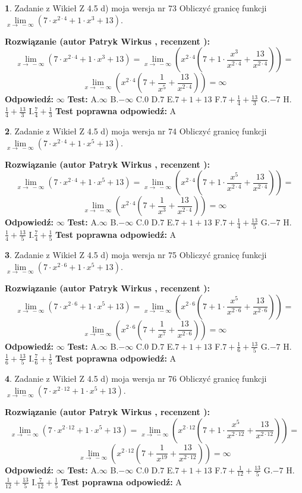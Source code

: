 \documentclass[12pt, a4paper]{article}
\theoremstyle{definition} %
\newtheorem{zad}{}
\newcommand{\zadStart}[1]{\begin{zad}#1\newline}
\newcommand{\zadStop}{\end{zad}}
\newcommand{\rozwStart}[2]{\noindent \textbf{Rozwiązanie (autor #1 , recenzent #2): }\newline}
\newcommand{\rozwStop}{\newline}
\newcommand{\odpStart}{\noindent \textbf{Odpowiedź:}\newline}
\newcommand{\odpStop}{\newline}
\newcommand{\testStart}{\noindent \textbf{Test:}\newline}
\newcommand{\testStop}{\newline}
\newcommand{\kluczStart}{\noindent \textbf{Test poprawna odpowiedź:}\newline}
\newcommand{\kluczStop}{\newline}
\begin{document}
\zadStart{Zadanie z Wikieł Z 4.5 d) moja wersja nr 73}
Obliczyć granicę funkcji  $\lim\limits_{x\to\ -\infty}(7 \cdot x^{2\cdot4}+1 \cdot x^{3}+13)$.
\zadStop
\rozwStart{Patryk Wirkus}{}
$$\lim\limits_{x\to\ -\infty}(7 \cdot x^{2\cdot4}+1 \cdot x^{3}+13) = \lim\limits_{x\to\ -\infty}(x^{2\cdot4}(7 +1 \cdot \frac{x^{3}}{x^{2\cdot4}}+\frac{13}{x^{2\cdot4}})) =$$ $$\lim\limits_{x\to\ -\infty}(x^{2\cdot4}(7 +\frac{1}{x^{5}}+\frac{13}{x^{2\cdot4}})) =\infty$$
\rozwStop
\odpStart
$\infty$
\odpStop
\testStart
A.$\infty$ B.$-\infty$ C.$0$ D.$7$ E.$7 + 1 + 13$
F.$7+\frac{1}{4}+\frac{13}{3}$ G.$-7$
H.$\frac{1}{4}+\frac{13}{3}$
I.$\frac{7}{4}+\frac{1}{3}$
\testStop
\kluczStart
A
\kluczStop



\zadStart{Zadanie z Wikieł Z 4.5 d) moja wersja nr 74}
Obliczyć granicę funkcji  $\lim\limits_{x\to\ -\infty}(7 \cdot x^{2\cdot4}+1 \cdot x^{5}+13)$.
\zadStop
\rozwStart{Patryk Wirkus}{}
$$\lim\limits_{x\to\ -\infty}(7 \cdot x^{2\cdot4}+1 \cdot x^{5}+13) = \lim\limits_{x\to\ -\infty}(x^{2\cdot4}(7 +1 \cdot \frac{x^{5}}{x^{2\cdot4}}+\frac{13}{x^{2\cdot4}})) =$$ $$\lim\limits_{x\to\ -\infty}(x^{2\cdot4}(7 +\frac{1}{x^{3}}+\frac{13}{x^{2\cdot4}})) =\infty$$
\rozwStop
\odpStart
$\infty$
\odpStop
\testStart
A.$\infty$ B.$-\infty$ C.$0$ D.$7$ E.$7 + 1 + 13$
F.$7+\frac{1}{4}+\frac{13}{5}$ G.$-7$
H.$\frac{1}{4}+\frac{13}{5}$
I.$\frac{7}{4}+\frac{1}{5}$
\testStop
\kluczStart
A
\kluczStop



\zadStart{Zadanie z Wikieł Z 4.5 d) moja wersja nr 75}
Obliczyć granicę funkcji  $\lim\limits_{x\to\ -\infty}(7 \cdot x^{2\cdot6}+1 \cdot x^{5}+13)$.
\zadStop
\rozwStart{Patryk Wirkus}{}
$$\lim\limits_{x\to\ -\infty}(7 \cdot x^{2\cdot6}+1 \cdot x^{5}+13) = \lim\limits_{x\to\ -\infty}(x^{2\cdot6}(7 +1 \cdot \frac{x^{5}}{x^{2\cdot6}}+\frac{13}{x^{2\cdot6}})) =$$ $$\lim\limits_{x\to\ -\infty}(x^{2\cdot6}(7 +\frac{1}{x^{7}}+\frac{13}{x^{2\cdot6}})) =\infty$$
\rozwStop
\odpStart
$\infty$
\odpStop
\testStart
A.$\infty$ B.$-\infty$ C.$0$ D.$7$ E.$7 + 1 + 13$
F.$7+\frac{1}{6}+\frac{13}{5}$ G.$-7$
H.$\frac{1}{6}+\frac{13}{5}$
I.$\frac{7}{6}+\frac{1}{5}$
\testStop
\kluczStart
A
\kluczStop



\zadStart{Zadanie z Wikieł Z 4.5 d) moja wersja nr 76}
Obliczyć granicę funkcji  $\lim\limits_{x\to\ -\infty}(7 \cdot x^{2\cdot12}+1 \cdot x^{5}+13)$.
\zadStop
\rozwStart{Patryk Wirkus}{}
$$\lim\limits_{x\to\ -\infty}(7 \cdot x^{2\cdot12}+1 \cdot x^{5}+13) = \lim\limits_{x\to\ -\infty}(x^{2\cdot12}(7 +1 \cdot \frac{x^{5}}{x^{2\cdot12}}+\frac{13}{x^{2\cdot12}})) =$$ $$\lim\limits_{x\to\ -\infty}(x^{2\cdot12}(7 +\frac{1}{x^{19}}+\frac{13}{x^{2\cdot12}})) =\infty$$
\rozwStop
\odpStart
$\infty$
\odpStop
\testStart
A.$\infty$ B.$-\infty$ C.$0$ D.$7$ E.$7 + 1 + 13$
F.$7+\frac{1}{12}+\frac{13}{5}$ G.$-7$
H.$\frac{1}{12}+\frac{13}{5}$
I.$\frac{7}{12}+\frac{1}{5}$
\testStop
\kluczStart
A
\kluczStop
\end{document}
